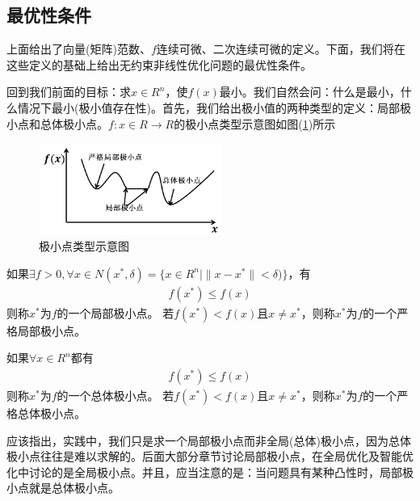     \subsection{最优性条件}
        \par
        上面给出了向量(矩阵)范数、$f$连续可微、二次连续可微的定义。下面，我们将在这些定义的基础上给出无约束非线性优化问题的最优性条件。
        \par
        回到我们前面的目标：求$x \in R^n$，使$f(x)$最小。我们自然会问：什么是最小，什么情况下最小(极小值存在性)。首先，我们给出极小值的两种类型的定义：局部极小点和总体极小点。$f:x \in R\to R$的极小点类型示意图如图(\ref{极小点类型示意图})所示
        \begin{figure}[H]
        \centering
        \includegraphics[height=3cm]{images/Minimal_point.jpg}
        \caption{极小点类型示意图}
        \label{极小点类型示意图}
        \end{figure}
        \begin{definition}[局部极小点]
          如果$\exists f >0,\forall x \in N(x^{*},\delta) = \{x \in R^n |\|x-x^{*}\|<\delta)\}$，有
          \begin{align*}
            f(x^{*}) \leqslant f(x)
          \end{align*}
          则称$x^{*}$为$f$的一个局部极小点。
          若$f(x^{*})<f(x)$且$x \ne x^{*}$，则称$x^{*}$为$f$的一个严格局部极小点。
        \end{definition}
        \begin{definition}[总体极小点]
          如果$\forall x \in R^n$都有
          \begin{align*}
            f(x^{*}) \leqslant f(x)
          \end{align*}
          则称$x^{*}$为$f$的一个总体极小点。
          若$f(x^{*})<f(x)$且$x \ne x^{*}$，则称$x^{*}$为$f$的一个严格总体极小点。
        \end{definition}
        \par
        应该指出，实践中，我们只是求一个局部极小点而非全局(总体)极小点，因为总体极小点往往是难以求解的。后面大部分章节讨论局部极小点，在全局优化及智能优化中讨论的是全局极小点。并且，应当注意的是：当问题具有某种凸性时，局部极小点就是总体极小点。
